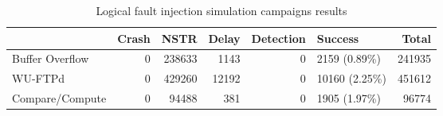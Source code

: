 \begin{table}[H]
\centering
\caption{Logical fault injection simulation campaigns results}
\label{table:end_sim_by_status_wop_single_bitflip_temporel}
\begin{tabular}{lrrrrlr}
\toprule
 & Crash & NSTR & Delay & Detection & Success & Total \\
\midrule
Buffer Overflow & 0 & 238633 & 1143 & 0 & 2159 (0.89\%) & 241935 \\
WU-FTPd & 0 & 429260 & 12192 & 0 & 10160 (2.25\%) & 451612 \\
Compare/Compute & 0 & 94488 & 381 & 0 & 1905 (1.97\%) & 96774 \\
\bottomrule
\end{tabular}
\end{table}
